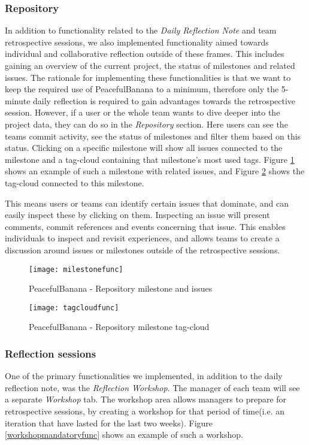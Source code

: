 \subsubsection{Repository}
In addition to functionality related to the \emph{Daily Reflection Note} and team retrospective sessions, we also implemented functionality aimed towards individual and collaborative reflection outside of these frames. This includes gaining an overview of the current project, the status of milestones and related issues. The rationale for implementing these functionalities is that we want to keep the required use of PeacefulBanana to a minimum, therefore only the 5-minute daily reflection is required to gain advantages towards the retrospective session. However, if a user or the whole team wants to dive deeper into the project data, they can do so in the \emph{Repository} section. Here users can see the teams commit activity, see the status of milestones and filter them based on this status. Clicking on a specific milestone will show all issues connected to the milestone and a tag-cloud containing that milestone's most used tags. Figure \ref{milestonefunc} shows an example of such a milestone with related issues, and Figure \ref{tagcloudfunc} shows the tag-cloud connected to this milestone. 

This means users or teams can identify certain issues that dominate, and can easily inspect these by clicking on them. Inspecting an issue will present comments, commit references and events concerning that issue. This enables individuals to inspect and revisit experiences, and allows teams to create a discussion around issues or milestones outside of the retrospective sessions. 

\begin{figure}[H]
    \centering
        \texttt{[image: milestonefunc]}
    \caption{PeacefulBanana - Repository milestone and issues}
    \label{milestonefunc}
\end{figure}

\begin{figure}[H]
    \centering
        \texttt{[image: tagcloudfunc]}
    \caption{PeacefulBanana - Repository milestone tag-cloud}
    \label{tagcloudfunc}
\end{figure}

\subsubsection{Reflection sessions}
One of the primary functionalities we implemented, in addition to the daily reflection note, was the \emph{Reflection Workshop}. The manager of each team will see a separate \emph{Workshop} tab. The workshop area allows managers to prepare for retrospective sessions, by creating a workshop for that period of time(i.e. an iteration that have lasted for the last two weeks). Figure \ref{workshopmandatoryfunc} shows an example of such a workshop. 

